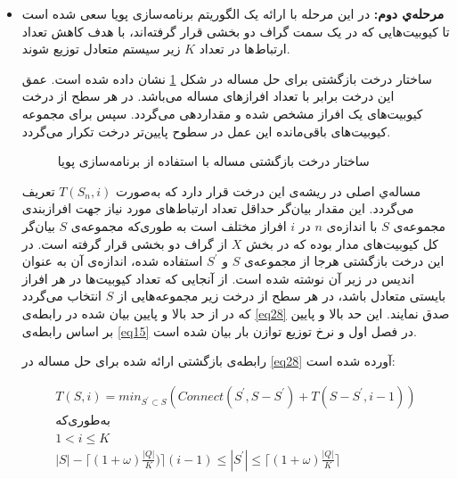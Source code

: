 \begin{itemize}
\item
\textbf{مرحله‌ي دوم:}
در این مرحله با ارائه یک الگوریتم برنامه‌سازی پویا سعی شده است تا کیوبیت‌هایی که در یک سمت گراف دو بخشی قرار گرفته‌اند، با هدف کاهش تعداد ارتباط‌ها در تعداد $K$ زیر سیستم متعادل توزیع شوند. 

ساختار درخت بازگشتی برای حل مساله در شکل \ref{12} نشان داده شده است. عمق این درخت برابر با تعداد افرازهای مساله می‌باشد. در هر سطح از درخت کیوبیت‌های یک افراز مشخص شده و مقداردهی می‌گردد. سپس برای مجموعه کیوبیت‌های باقی‌مانده این عمل در سطوح پایین‌تر درخت تکرار می‌گردد. 
\begin{figure}
\caption{ساختار درخت بازگشتی مساله با استفاده از برنامه‌سازی پویا}
\label{12}
\end{figure}
مساله‌ي اصلی در ریشه‌ی این درخت قرار دارد که به‌صورت $T(S_n,i)$ تعریف می‌گردد. این مقدار بیان‌گر حداقل تعداد ارتباط‌های مورد نیاز جهت افراز‌بندی مجموعه‌ی $S$ با اندازه‌ی $n$ در $i$ افراز مختلف است به طوری‌که مجموعه‌ی $S$ بیان‌گر کل کیوبیت‌های مدار بوده که در بخش $X$ از گراف دو بخشی قرار گرفته است. در این درخت بازگشتی هرجا از مجموعه‌ی $S$ و $S^{'}$ استفاده شده، اندازه‌ی آن به عنوان اندیس در زیر آن نوشته شده است. از آنجایی که تعداد کیوبیت‌ها در هر افراز بایستی متعادل باشد، در هر سطح از درخت زیر مجموعه‌هایی از $S$ انتخاب می‌گردد که در از حد بالا و پایین بیان شده در رابطه‌ی \eqref{eq28} صدق نمایند. این حد بالا و پایین بر اساس رابطه‌ی \eqref{eq15} در فصل اول و نرخ توزیع توازن بار بیان شده است.

رابطه‌ی بازگشتی ارائه شده برای حل مساله در \eqref{eq28} آورده شده است:
\begin{center}
\begin{equation}
\begin{split}
T(S,i)=min_{S^{'} \subset S }( Connect(S^{'}, S-S^{'})+T(S-S^{'},i-1))\\
\text{به‌طوری‌که}\\
   1< i\leq K\\
|S|-\lceil(1+\omega)\frac{|Q|}{K})\rceil(i-1) \leq|S^{'}| \leq \lceil(1+\omega)\frac{|Q|}{K}\rceil\\
\end{split}
\label{eq28}
\end{equation}
\end{center}




\end{itemize}
